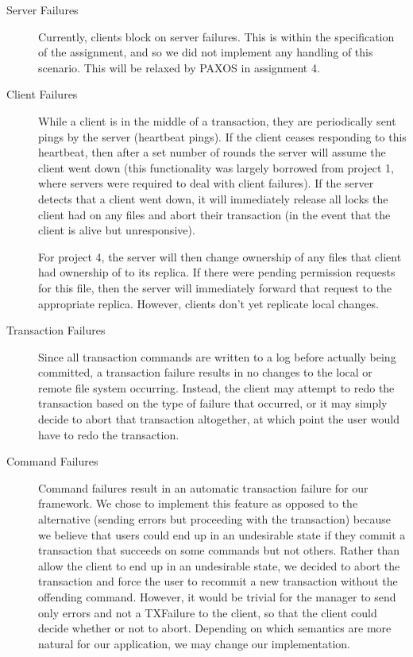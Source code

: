 \documentclass[11pt]{article}
\begin{document}
\begin{description}
\item[Server Failures] Currently, clients block on server failures. This is within the specification of the assignment, and so we did not implement any handling of this scenario. This will be relaxed by PAXOS in assignment 4.
\item[Client Failures] While a client is in the middle of a transaction, they are periodically sent pings by the server (heartbeat pings). If the client ceases responding to this heartbeat, then after a set number of rounds the server will assume the client went down (this functionality was largely borrowed from project 1, where servers were required to deal with client failures). If the server detects that a client went down, it will immediately release all locks the client had on any files and abort their transaction (in the event that the client is alive but unresponsive).

For project 4, the server will then change ownership of any files that client had ownership of to its replica. If there were pending permission requests for this file, then the server will immediately forward that request to the appropriate replica. However, clients don't yet replicate local changes.

\item[Transaction Failures] Since all transaction commands are written to a log before actually being committed, a transaction failure results in no changes to the local or remote file system occurring. Instead, the client may attempt to redo the transaction based on the type of failure that occurred, or it may simply decide to abort that transaction altogether, at which point the user would have to redo the transaction. 
\item[Command Failures] Command failures result in an automatic transaction failure for our framework. We chose to implement this feature as opposed to the alternative (sending errors but proceeding with the transaction) because we believe that users could end up in an undesirable state if they commit a transaction that succeeds on some commands but not others. Rather than allow the client to end up in an undesirable state, we decided to abort the transaction and force the user to recommit a new transaction without the offending command. However, it would be trivial for the manager to send only errors and not a TXFailure to the client, so that the client could decide whether or not to abort. Depending on which semantics are more natural for our application, we may change our implementation. 
\end{description}
\end{document}
